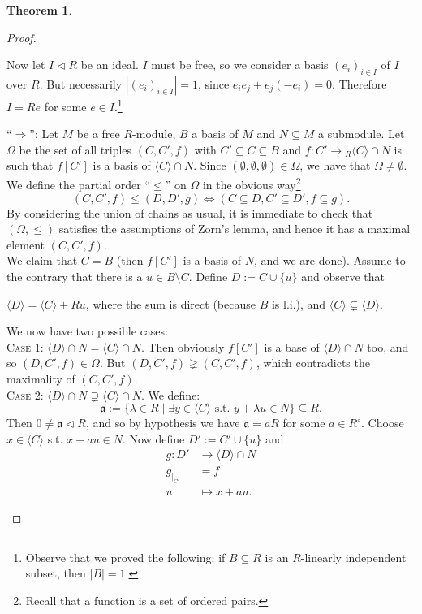 \documentclass[12pt,a4paper]{report}
\theoremstyle{definition}
\newtheorem{theorem}{Theorem}[chapter] %
\theoremstyle{num.custom-title}
\DeclareMathOperator{\imp}{\Rightarrow}
\DeclareMathOperator{\sm}{\setminus}
\DeclareMathOperator{\sse}{\subseteq}
\renewcommand{\iff}{\Leftrightarrow}
\begin{document}
\begin{theorem}
\begin{proof}
\begin{enumerate}
Now let $I \lhd R$ be an ideal. $I$ must be free, so we consider a basis $(e_i)_{i \in I}$ of $I$ over $R$. But necessarily $|(e_i)_{i \in I}|=1$, since $e_i e_j + e_j (-e_i) = 0$. Therefore $I = R e$ for some $e \in I$.\footnote{Observe that we proved the following: if $B \sse R$ is an $R$-linearly independent subset, then $|B|=1$.}

``$\imp$'': Let $M$ be a free $R$-module, $B$ a basis of $M$ and $N \sse M$ a submodule. Let $\Omega$ be the set of all triples $(C,C',f)$ with $C' \sse C \sse B$ and $f: C' \to {}_R \langle C \rangle \cap N$ is such that $f[C']$ is a basis of $\langle C \rangle \cap N$. Since $(\emptyset, \emptyset, \emptyset) \in \Omega$, we have that $\Omega \neq \emptyset$. We define the partial order ``$\leq$'' on $\Omega$ in the obvious way\footnote{Recall that a function is a set of ordered pairs.}
\[
(C,C',f) \leq (D,D',g) \iff (C \sse D, C' \sse D', f \sse g).
\]
By considering the union of chains as usual, it is immediate to check that $(\Omega,\leq)$ satisfies the assumptions of Zorn's lemma, and hence it has a maximal element $(C,C',f)$.\\
We claim that $C=B$ (then $f[C']$ is a basis of $N$, and we are done). Assume to the contrary that there is a $u \in B \sm C$. Define $D := C \cup \{u\}$ and observe that
\begin{center}
$\langle D \rangle = \langle C \rangle + Ru$, where the sum is direct (because $B$ is l.i.), and $\langle C \rangle \subsetneq \langle D \rangle$.
\end{center}
We now have two possible cases:\\
\textsc{Case 1:} $\langle D \rangle \cap N = \langle C \rangle \cap N$. Then obviously $f[C']$ is a base of $\langle D \rangle \cap N$ too, and so $(D,C',f) \in \Omega$. But $(D,C',f) \gneq (C,C',f)$, which contradicts the maximality of $(C,C',f)$.\\
\textsc{Case 2:} $\langle D \rangle \cap N \supsetneq \langle C \rangle \cap N$. We define:
\[
\mathfrak{a} := \{\lambda \in R \mid \exists y \in \langle C \rangle \text{ s.t. } y + \lambda u \in N\} \sse R.
\]
Then $0 \neq \mathfrak{a} \lhd R$, and so by hypothesis we have $\mathfrak{a} = aR$ for some $a \in R^\circ$. Choose $x \in \langle C \rangle$ s.t. $x + au \in N$. Now define $D' := C' \cup \{u\}$ and
\begin{align*}
g \colon D' &\to \langle D \rangle \cap N \\
g_{|_{C'}} &= f \\
u &\mapsto x + au.
\end{align*}

\end{enumerate}
\end{proof}
\end{theorem}
\end{document}
